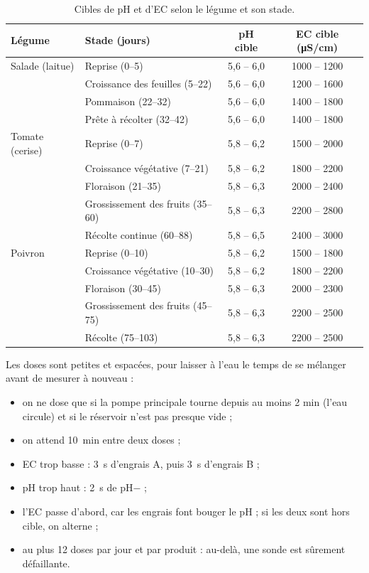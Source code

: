 \begin{table}[H]
\centering
\small
\begin{tabularx}{\textwidth}{|l|l|c|c|}
\hline
\textbf{Légume} & \textbf{Stade (jours)} & \textbf{pH cible} & \textbf{EC cible (\unit{\micro S/cm})} \\
\hline
Salade (laitue) & Reprise (0--5) & 5,6 -- 6,0 & 1000 -- 1200 \\
 & Croissance des feuilles (5--22) & 5,6 -- 6,0 & 1200 -- 1600 \\
 & Pommaison (22--32) & 5,6 -- 6,0 & 1400 -- 1800 \\
 & Prête à récolter (32--42) & 5,6 -- 6,0 & 1400 -- 1800 \\
\hline
Tomate (cerise) & Reprise (0--7) & 5,8 -- 6,2 & 1500 -- 2000 \\
 & Croissance végétative (7--21) & 5,8 -- 6,2 & 1800 -- 2200 \\
 & Floraison (21--35) & 5,8 -- 6,3 & 2000 -- 2400 \\
 & Grossissement des fruits (35--60) & 5,8 -- 6,3 & 2200 -- 2800 \\
 & Récolte continue (60--88) & 5,8 -- 6,5 & 2400 -- 3000 \\
\hline
Poivron & Reprise (0--10) & 5,8 -- 6,2 & 1500 -- 1800 \\
 & Croissance végétative (10--30) & 5,8 -- 6,2 & 1800 -- 2200 \\
 & Floraison (30--45) & 5,8 -- 6,3 & 2000 -- 2300 \\
 & Grossissement des fruits (45--75) & 5,8 -- 6,3 & 2200 -- 2500 \\
 & Récolte (75--103) & 5,8 -- 6,3 & 2200 -- 2500 \\
\hline
\end{tabularx}
\caption{Cibles de pH et d'EC selon le légume et son stade.}
\end{table}

Les doses sont petites et espacées, pour laisser à l'eau le temps de se mélanger avant de mesurer à nouveau :

\begin{itemize}
\item on ne dose que si la pompe principale tourne depuis au moins 2 min (l'eau circule) et si le réservoir n'est pas presque vide ;
\item on attend \qty{10}{min} entre deux doses ;
\item EC trop basse : \qty{3}{s} d'engrais A, puis \qty{3}{s} d'engrais B ;
\item pH trop haut : \qty{2}{s} de pH$-$ ;
\item l'EC passe d'abord, car les engrais font bouger le pH ; si les deux sont hors cible, on alterne ;
\item au plus 12 doses par jour et par produit : au-delà, une sonde est sûrement défaillante.
\end{itemize}

